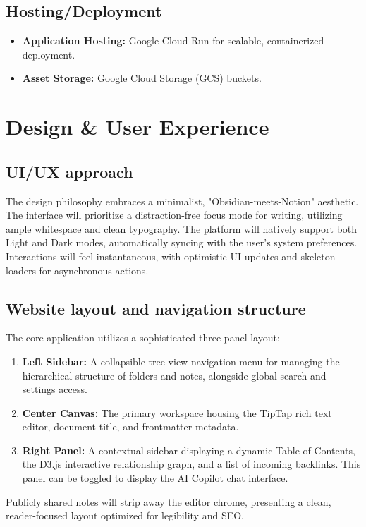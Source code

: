 \documentclass[12pt, a4paper]{article}
\begin{document}
\subsection{Hosting/Deployment}
\begin{itemize}[leftmargin=2em]
    \item \textbf{Application Hosting:} Google Cloud Run for scalable, containerized deployment.
    \item \textbf{Asset Storage:} Google Cloud Storage (GCS) buckets.
\end{itemize}

\section{Design \& User Experience}

\subsection{UI/UX approach}
The design philosophy embraces a minimalist, "Obsidian-meets-Notion" aesthetic. The interface will prioritize a distraction-free focus mode for writing, utilizing ample whitespace and clean typography. The platform will natively support both Light and Dark modes, automatically syncing with the user's system preferences. Interactions will feel instantaneous, with optimistic UI updates and skeleton loaders for asynchronous actions.

\subsection{Website layout and navigation structure}
The core application utilizes a sophisticated three-panel layout:
\begin{enumerate}[leftmargin=2em]
    \item \textbf{Left Sidebar:} A collapsible tree-view navigation menu for managing the hierarchical structure of folders and notes, alongside global search and settings access.
    \item \textbf{Center Canvas:} The primary workspace housing the TipTap rich text editor, document title, and frontmatter metadata.
    \item \textbf{Right Panel:} A contextual sidebar displaying a dynamic Table of Contents, the D3.js interactive relationship graph, and a list of incoming backlinks. This panel can be toggled to display the AI Copilot chat interface.
\end{enumerate}
Publicly shared notes will strip away the editor chrome, presenting a clean, reader-focused layout optimized for legibility and SEO.
\end{document}

